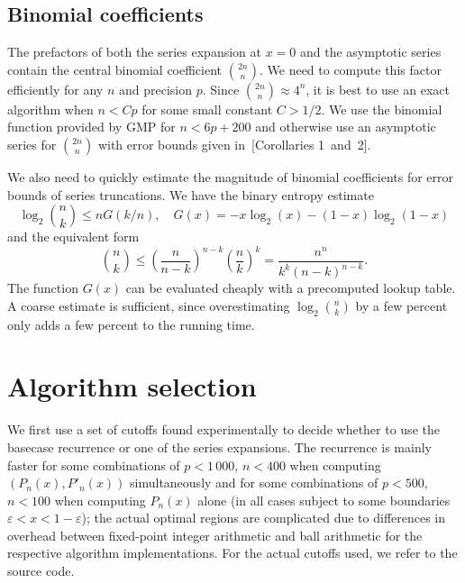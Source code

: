 \documentclass[nohypdvips,review]{siamart0216}
\begin{document}
\subsection{Binomial coefficients}

\label{sec:binomial}

The prefactors of both the series expansion at ${x = 0}$ and the asymptotic series
contain the central binomial coefficient ${2n \choose n}$.
We need to compute this factor efficiently for any $n$ and precision $p$.
Since ${2n \choose n} \approx 4^n$, it is best to use
an exact algorithm when $n < Cp$ for some small constant $C > 1/2$.
We use the binomial function provided by GMP for $n < 6p + 200$
and otherwise use an asymptotic series for ${2n \choose n}$
with error bounds given
in~[Corollaries 1~and~2]\cite{brent2016asymptotic}.

We also need to quickly estimate the magnitude of binomial coefficients
for error bounds of series truncations.
We have the binary entropy estimate
$$\log_2 {n \choose k} \le n G(k/n), \quad G(x) = -x \log_2(x) - (1-x) \log_2(1-x)$$
and the equivalent form
\begin{equation}
\label{eq:binbound}
{n \choose k} \le \left(\frac{n}{n-k}\right)^{n-k} \left(\frac{n}{k}\right)^k = \frac{n^n}{k^k (n-k)^{n-k}}.
\end{equation}
The function $G(x)$ can be evaluated cheaply with a precomputed
lookup table. A coarse estimate is sufficient, since overestimating
$\log_2 {n \choose k}$ by a few percent only adds a few
percent to the running time.

\section{Algorithm selection}

\label{sec:selection}

We first use a set of cutoffs found experimentally to decide whether to use the basecase recurrence or one of the series expansions. The recurrence is mainly faster for some combinations of $p < 1\,000$, $n < 400$ when computing $(P_n(x), P'_n(x))$ simultaneously and for some combinations of $p < 500$, $n < 100$ when computing $P_n(x)$ alone (in all cases subject to some boundaries $\varepsilon < x < 1 - \varepsilon$); the actual optimal regions are complicated due to differences in overhead between fixed-point integer arithmetic and ball arithmetic for the respective algorithm implementations. For the actual cutoffs used, we refer to the source code.
\end{document}
